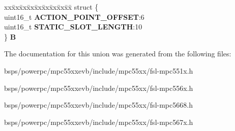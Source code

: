 \begin{DoxyCompactItemize}
\begin{tabbing}
\end{tabbing}\item 
\mbox{\label{unionuPCR0_af8d4d1dfc621616682d271b74b77f044}} 
\begin{tabbing}
xx\=xx\=xx\=xx\=xx\=xx\=xx\=xx\=xx\=\kill
struct \{\\
\>uint16\_t {\bfseries ACTION\_POINT\_OFFSET}:6\\
\>uint16\_t {\bfseries STATIC\_SLOT\_LENGTH}:10\\
\} {\bfseries B}\\

\end{tabbing}\end{DoxyCompactItemize}


The documentation for this union was generated from the following files\+:\begin{DoxyCompactItemize}
\item 
bsps/powerpc/mpc55xxevb/include/mpc55xx/fsl-\/mpc551x.\+h\item 
bsps/powerpc/mpc55xxevb/include/mpc55xx/fsl-\/mpc556x.\+h\item 
bsps/powerpc/mpc55xxevb/include/mpc55xx/fsl-\/mpc5668.\+h\item 
bsps/powerpc/mpc55xxevb/include/mpc55xx/fsl-\/mpc567x.\+h\end{DoxyCompactItemize}
